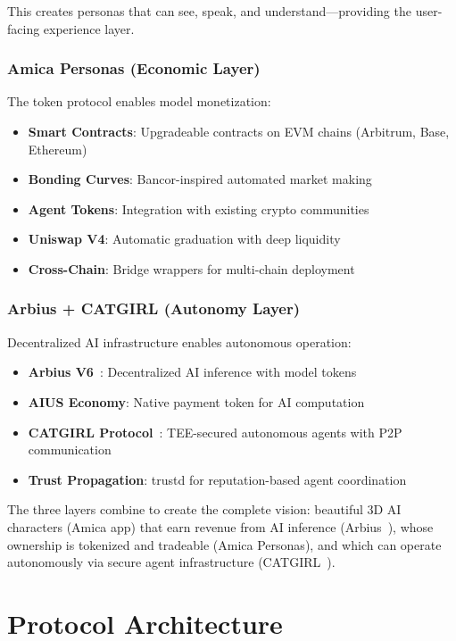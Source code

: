 \documentclass{article}
\begin{document}
This creates personas that can see, speak, and understand—providing the user-facing experience layer.

\subsubsection{Amica Personas (Economic Layer)}

The token protocol enables model monetization:
\begin{itemize}
    \item \textbf{Smart Contracts}: Upgradeable contracts on EVM chains (Arbitrum, Base, Ethereum)
    \item \textbf{Bonding Curves}: Bancor-inspired automated market making
    \item \textbf{Agent Tokens}: Integration with existing crypto communities
    \item \textbf{Uniswap V4}: Automatic graduation with deep liquidity
    \item \textbf{Cross-Chain}: Bridge wrappers for multi-chain deployment
\end{itemize}

\subsubsection{Arbius + CATGIRL (Autonomy Layer)}

Decentralized AI infrastructure enables autonomous operation:
\begin{itemize}
    \item \textbf{Arbius V6}~\cite{arbius2023}: Decentralized AI inference with model tokens
    \item \textbf{AIUS Economy}: Native payment token for AI computation
    \item \textbf{CATGIRL Protocol}~\cite{catgirl2025}: TEE-secured autonomous agents with P2P communication
    \item \textbf{Trust Propagation}: trustd for reputation-based agent coordination
\end{itemize}

The three layers combine to create the complete vision: beautiful 3D AI characters (Amica app) that earn revenue from AI inference (Arbius~\cite{arbius2023}), whose ownership is tokenized and tradeable (Amica Personas), and which can operate autonomously via secure agent infrastructure (CATGIRL~\cite{catgirl2025}).

\section{Protocol Architecture}
\end{document}
